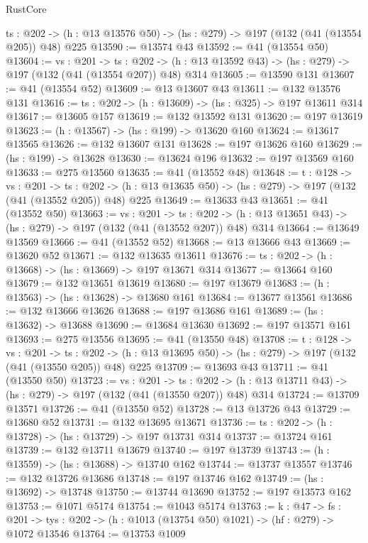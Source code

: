 \begin{lexlean}{RustCore}
\begin{coremodule}
  {ts : @202} -> (h : @13 @13576 @50) -> (hs : @279) -> @197 (@132 (@41 (@13554 @205)) @48) @225
@13590 := @13574 @43
@13592 := @41 (@13554 @50)
@13604 := {vs : @201} ->
  {ts : @202} -> (h : @13 @13592 @43) -> (hs : @279) -> @197 (@132 (@41 (@13554 @207)) @48) @314
@13605 := @13590 @131
@13607 := @41 (@13554 @52)
@13609 := @13 @13607 @43
@13611 := @132 @13576 @131
@13616 := {ts : @202} -> (h : @13609) -> (hs : @325) -> @197 @13611 @314
@13617 := @13605 @157
@13619 := @132 @13592 @131
@13620 := @197 @13619
@13623 := (h : @13567) -> (hs : @199) -> @13620 @160
@13624 := @13617 @13565
@13626 := @132 @13607 @131
@13628 := @197 @13626 @160
@13629 := (hs : @199) -> @13628
@13630 := @13624 @196
@13632 := @197 @13569 @160
@13633 := @275 @13560
@13635 := @41 (@13552 @48)
@13648 := {t : @128} ->
  {vs : @201} ->
  {ts : @202} -> (h : @13 @13635 @50) -> (hs : @279) -> @197 (@132 (@41 (@13552 @205)) @48) @225
@13649 := @13633 @43
@13651 := @41 (@13552 @50)
@13663 := {vs : @201} ->
  {ts : @202} -> (h : @13 @13651 @43) -> (hs : @279) -> @197 (@132 (@41 (@13552 @207)) @48) @314
@13664 := @13649 @13569
@13666 := @41 (@13552 @52)
@13668 := @13 @13666 @43
@13669 := @13620 @52
@13671 := @132 @13635 @13611
@13676 := {ts : @202} -> (h : @13668) -> (hs : @13669) -> @197 @13671 @314
@13677 := @13664 @160
@13679 := @132 @13651 @13619
@13680 := @197 @13679
@13683 := (h : @13563) -> (hs : @13628) -> @13680 @161
@13684 := @13677 @13561
@13686 := @132 @13666 @13626
@13688 := @197 @13686 @161
@13689 := (hs : @13632) -> @13688
@13690 := @13684 @13630
@13692 := @197 @13571 @161
@13693 := @275 @13556
@13695 := @41 (@13550 @48)
@13708 := {t : @128} ->
  {vs : @201} ->
  {ts : @202} -> (h : @13 @13695 @50) -> (hs : @279) -> @197 (@132 (@41 (@13550 @205)) @48) @225
@13709 := @13693 @43
@13711 := @41 (@13550 @50)
@13723 := {vs : @201} ->
  {ts : @202} -> (h : @13 @13711 @43) -> (hs : @279) -> @197 (@132 (@41 (@13550 @207)) @48) @314
@13724 := @13709 @13571
@13726 := @41 (@13550 @52)
@13728 := @13 @13726 @43
@13729 := @13680 @52
@13731 := @132 @13695 @13671
@13736 := {ts : @202} -> (h : @13728) -> (hs : @13729) -> @197 @13731 @314
@13737 := @13724 @161
@13739 := @132 @13711 @13679
@13740 := @197 @13739
@13743 := (h : @13559) -> (hs : @13688) -> @13740 @162
@13744 := @13737 @13557
@13746 := @132 @13726 @13686
@13748 := @197 @13746 @162
@13749 := (hs : @13692) -> @13748
@13750 := @13744 @13690
@13752 := @197 @13573 @162
@13753 := @1071 @5174
@13754 := @1043 @5174
@13763 := {k : @47} ->
  {fs : @201} -> {tys : @202} -> (h : @1013 (@13754 @50) @1021) -> (hf : @279) -> @1072 @13546
@13764 := @13753 @1009

\end{coremodule}
\end{lexlean}
